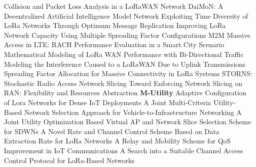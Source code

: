  \cite{ferre_collision_2017} Collision and Packet Loss Analysis in a {{LoRaWAN}} Network \newline 
 \cite{teerapittayanon_daimon_2019} {{DaiMoN}}: {{A Decentralized Artificial Intelligence Model Network}} \newline 
 \cite{hoeller_exploiting_2018} Exploiting {{Time Diversity}} of {{LoRa Networks Through Optimum Message Replication}} \newline 
 \cite{zorbas_improving_2018} Improving {{LoRa Network Capacity Using Multiple Spreading Factor Configurations}} \newline 
 \cite{polese_m2m_2016} {{M2M}} Massive Access in {{LTE}}: {{RACH}} Performance Evaluation in a {{Smart City}} Scenario \newline 
 \cite{capuzzo_mathematical_2018} Mathematical {{Modeling}} of {{LoRa WAN Performance}} with {{Bi}}-Directional {{Traffic}} \newline 
 \cite{irio_modeling_2019} Modeling the {{Interference}} Caused to a {{LoRaWAN }} Due to {{Uplink Transmissions}} \newline 
 \cite{lim_spreading_2018} Spreading {{Factor Allocation}} for {{Massive Connectivity}} in {{LoRa Systems}} \newline 
 \cite{sciancalepore_storns_2019} {{STORNS}}: {{Stochastic Radio Access Network Slicing}} \newline 
 \cite{ksentini_toward_2017} Toward {{Enforcing Network Slicing}} on {{RAN}}: {{Flexibility}} and {{Resources Abstraction}} \newline 
\textbf{M-Utility} \newline  \cite{slabicki_adaptive_2018} Adaptive Configuration of Lora Networks for Dense {{IoT}} Deployments \newline 
 \cite{jiang_joint_2018} A {{Joint Multi}}-{{Criteria Utility}}-{{Based Network Selection Approach}} for {{Vehicle}}-to-{{Infrastructure Networking}} \newline 
 \cite{xun_hu_joint_2015} A Joint Utility Optimization Based Virtual {{AP}} and Network Slice Selection Scheme for {{SDWNs}} \newline 
 \cite{zhou_novel_2019} A {{Novel Rate}} and {{Channel Control Scheme Based}} on {{Data Extraction Rate}} for {{LoRa Networks}} \newline 
 \cite{simiscuka_relay_2018} A {{Relay}} and {{Mobility Scheme}} for {{QoS Improvement}} in {{IoT Communications}} \newline 
 \cite{farooq_search_2018} A {{Search}} into a {{Suitable Channel Access Control Protocol}} for {{LoRa}}-{{Based Networks}} \newline 
